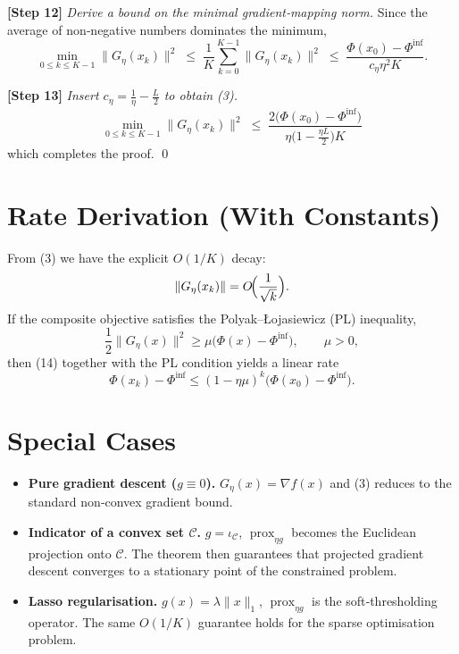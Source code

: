 \documentclass{article}
\newcommand{\prox}{\operatorname{prox}}
\newcommand{\grad}{\nabla}
\begin{document}
\noindent\textbf{[Step 12]} \emph{Derive a bound on the minimal gradient‑mapping norm.}
Since the average of non‑negative numbers dominates the minimum,
\[
\min_{0\le k\le K-1}\|G_{\eta}(x_{k})\|^{2}
\;\le\;\frac{1}{K}\sum_{k=0}^{K-1}\|G_{\eta}(x_{k})\|^{2}
\;\le\;\frac{\Phi(x_{0})-\Phi^{\inf}}{c_{\eta}\eta^{2}K}.
\tag{19}
\]

\noindent\textbf{[Step 13]} \emph{Insert $c_{\eta}= \frac{1}{\eta}-\frac{L}{2}$ to obtain (3).}
\[
\boxed{
\min_{0\le k\le K-1}\|G_{\eta}(x_{k})\|^{2}
\;\le\;
\frac{2\bigl(\Phi(x_{0})-\Phi^{\inf}\bigr)}
{\eta\bigl(1-\tfrac{\eta L}{2}\bigr)K}
}
\]
which completes the proof. \qed

\section*{Rate Derivation (With Constants)}
From (3) we have the explicit $O(1/K)$ decay:
\[
\|G_{\eta}(x_{k})\| = O\!\Bigl(\frac{1}{\sqrt{k}}\Bigr).
\]
If the composite objective satisfies the Polyak–Łojasiewicz (PL) inequality,
\[
\frac{1}{2}\|G_{\eta}(x)\|^{2}\ge\mu\bigl(\Phi(x)-\Phi^{\inf}\bigr),\qquad \mu>0,
\]
then (14) together with the PL condition yields a linear rate
\[
\Phi(x_{k})-\Phi^{\inf}\le (1-\eta\mu)^{k}\bigl(\Phi(x_{0})-\Phi^{\inf}\bigr).
\]

\section*{Special Cases}
\begin{itemize}
\item \textbf{Pure gradient descent ($g\equiv0$).} $G_{\eta}(x)=\grad f(x)$ and (3) reduces to the standard non‑convex gradient bound.
\item \textbf{Indicator of a convex set $\mathcal C$.} $g=\iota_{\mathcal C}$, $\prox_{\eta g}$ becomes the Euclidean projection onto $\mathcal C$. The theorem then guarantees that projected gradient descent converges to a stationary point of the constrained problem.
\item \textbf{Lasso regularisation.} $g(x)=\lambda\|x\|_{1}$, $\prox_{\eta g}$ is the soft‑thresholding operator. The same $O(1/K)$ guarantee holds for the sparse optimisation problem.
\end{itemize}
\end{document}
